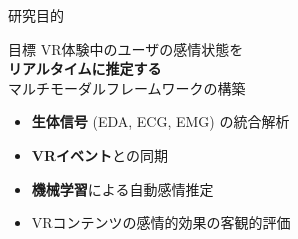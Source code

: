 \documentclass[aspectratio=169,10pt]{beamer}
\begin{document}
\begin{frame}{研究目的}
\begin{block}{目標}
\Large
VR体験中のユーザの感情状態を\\
\textbf{リアルタイムに推定する}\\
マルチモーダルフレームワークの構築
\end{block}

\vspace{0.5cm}

\begin{itemize}
\item \textbf{生体信号} (EDA, ECG, EMG) の統合解析
\item \textbf{VRイベント}との同期
\item \textbf{機械学習}による自動感情推定
\item VRコンテンツの感情的効果の客観的評価
\end{itemize}
\end{frame}
\end{document}
